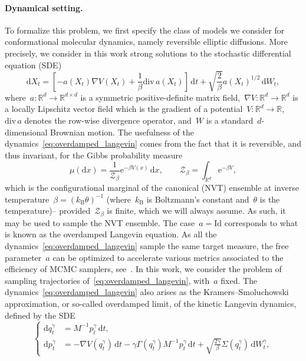 \documentclass[a4]{article}
\renewcommand{\d}{\mathrm{d}}
\newcommand{\e}{\mathrm{e}}
\renewcommand{\div}{\mathrm{div}}
\newcommand{\R}{\mathbb{R}}
\newcommand{\1}{\mathbbm 1}
\begin{document}
    \paragraph{Dynamical setting.}
    To formalize this problem, we first specify the class of models we consider for conformational molecular dynamics, namely reversible elliptic diffusions.
    More precisely, we consider in this work strong solutions to the stochastic differential equation (SDE)
    \begin{equation}
        \label{eq:overdamped_langevin}
        \d X_t = \left[-a(X_t)\nabla V(X_t) +\frac1\beta \div\,a(X_t)\right]\,\d t + \sqrt{\frac2\beta}a(X_t)^{1/2}\,\d W_t,
    \end{equation}
    where~$a:\R^d\to\R^{d\times d}$ is a symmetric positive-definite matrix field,~$\nabla V:\R^d\to\R^d$ is a locally Lipschitz vector field which is the gradient of a potential~$V:\R^d\to\R$,~$\div\,a$ denotes the row-wise divergence operator, and~$W$ is a standard~$d$-dimensional Brownian motion.
    The usefulness of the dynamics~\eqref{eq:overdamped_langevin} comes from the fact that it is reversible, and thus invariant, for the Gibbs probability measure
    \begin{equation}
        \label{eq:gibbs_measure}
        \mu(\d x) = \frac1{\mathcal Z_\beta}\e^{-\beta V(x)}\,\d x,\qquad \mathcal Z_\beta = \int_{\R^d} \e^{-\beta V},
    \end{equation}
    which is the configurational marginal of the canonical (NVT) ensemble at inverse temperature~$\beta=(k_{\mathrm{B}}\theta)^{-1}$ (where~$k_{\mathrm{B}}$ is Boltzmann's constant and~$\theta$ is the temperature)-- provided~$\mathcal Z_\beta$ is finite, which we will always assume.
    As such, it may be used to sample the NVT ensemble. The case~$a=\mathrm{Id}$ corresponds to what is known as the overdamped Langevin equation.
    As all the dynamics~\eqref{eq:overdamped_langevin} sample the same target measure, the free parameter~$a$ can be optimized to accelerate various metrics associated to the efficiency of MCMC samplers, see~\cite{LPRSS24,LSS24,CTZ24}.
    In this work, we consider the problem of sampling trajectories of~\eqref{eq:overdamped_langevin}, with~$a$ fixed.
    The dynamics~\eqref{eq:overdamped_langevin} also arises as the Kramers--Smoluchowski approximation, or so-called overdamped limit, of the kinetic Langevin dynamics, defined by the SDE
    \begin{equation}
        \label{eq:underdamped_langevin}
        \left\{\begin{aligned}
            \d q^\gamma_t &= M^{-1}p^\gamma_t\,\d t,\\
            \d p^\gamma_t &= -\nabla V(q^\gamma_t)\,\d t - \gamma \Gamma(q^\gamma_t)M^{-1}p^\gamma_t\,\d t + \sqrt{\frac{2\gamma}{\beta}}\Sigma(q^\gamma_t)\,\d W^\gamma_t,
        \end{aligned}
        \right.
    \end{equation}
\end{document}

